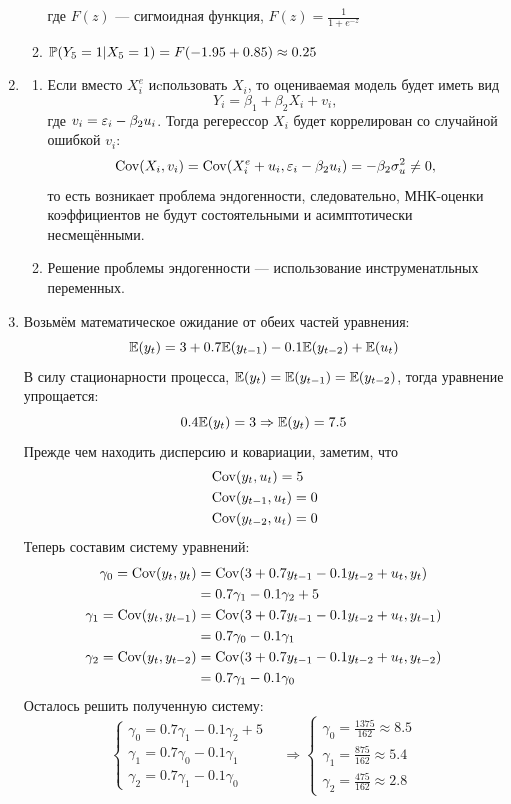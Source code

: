 \documentclass[12pt, a4paper]{article}
\begin{document}
\begin{enumerate}
\begin{enumerate}
\[\]
где $F(z)$ — сигмоидная функция, $F(z) = \frac{1}{1 + e^{-z}}$
\item $\P(Y_5 = 1 | X_5 = 1) = F(-1.95 + 0.85) \approx 0.25$
\end{enumerate}
\item
\begin{enumerate}
\item Если вместо $X^e_i$ иcпользовать $X_i$, то оцениваемая модель будет иметь вид
\[
Y_i = \beta_1 + \beta_2 X_i + v_i,
\]
где $v_i = \e_i - \beta_2 u_i$.
Тогда регерессор $X_i$ будет коррелирован со случайной ошибкой $v_i$:
\[
\Cov(X_i, v_i) = \Cov(X^e_i + u_i, \e_i - \beta_2 u_i) = -\beta_2 \sigma^2_u \neq 0,
\]
то есть возникает проблема эндогенности, следовательно, МНК-оценки коэффициентов
не будут состоятельными и асимптотически несмещёнными.
\item Решение проблемы эндогенности — использование инструменатльных переменных.
\end{enumerate}
\item Возьмём математическое ожидание от обеих частей уравнения:
\[
\E(y_t) = 3 + 0.7 \E(y_{t-1}) - 0.1 \E(y_{t-2}) + \E(u_t)
\]
В силу стационарности процесса, $\E(y_t) = \E(y_{t-1}) = \E(y_{t-2})$,
тогда уравнение упрощается:
\[
0.4 \E(y_t) = 3 \Rightarrow \E(y_t) = 7.5
\]
Прежде чем находить дисперсию и ковариации, заметим, что
\begin{align*}
& \Cov(y_t, u_t) = 5 \\
& \Cov(y_{t-1}, u_t) = 0 \\
& \Cov(y_{t-2}, u_t) = 0
\end{align*}
Теперь составим систему уравнений:
\begin{align*}
\gamma_0 = \Cov(y_t, y_t) &= \Cov(3 + 0.7 y_{t-1} - 0.1 y_{t-2} + u_t, y_t) \\
&= 0.7 \gamma_1 - 0.1 \gamma_2 + 5 \\
\gamma_1 = \Cov(y_t, y_{t-1}) &= \Cov(3 + 0.7 y_{t-1} - 0.1 y_{t-2} + u_t, y_{t-1}) \\
&= 0.7 \gamma_0 - 0.1 \gamma_1 \\
\gamma_2 = \Cov(y_t, y_{t-2}) &= \Cov(3 + 0.7 y_{t-1} - 0.1 y_{t-2} + u_t, y_{t-2}) \\
&= 0.7 \gamma_1 - 0.1 \gamma_0
\end{align*}
Осталось решить полученную систему:
\[
\begin{cases}
\gamma_0 = 0.7 \gamma_1 - 0.1 \gamma_2 + 5 \\
\gamma_1 = 0.7 \gamma_0 - 0.1 \gamma_1 \\
\gamma_2 = 0.7 \gamma_1 - 0.1 \gamma_0
\end{cases}
\quad \Rightarrow
\begin{cases}
\gamma_0 = \frac{1375}{162} \approx 8.5 \\
\gamma_1 = \frac{875}{162} \approx 5.4 \\
\gamma_2 = \frac{475}{162} \approx 2.8
\end{cases}
\]
\end{enumerate}
\end{document}

